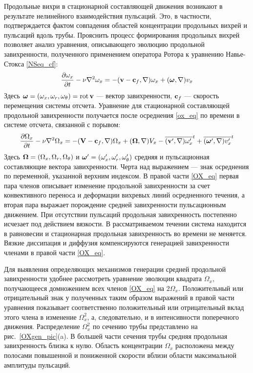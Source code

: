Продольные вихри в стационарной составляющей движения возникают в результате нелинейного взаимодействия пульсаций. Это, в частности, подтверждается фактом совпадения областей концентрации продольных вихрей и пульсаций вдоль трубы. Прояснить процесс формирования продольных вихрей позволяет анализ уравнения, описывающего эволюцию продольной завихренности, полученного применением оператора Ротора к уравнению Навье-Стокса \eqref{NSeq_cf}:
\begin{equation}\label{ox_eq}
\frac{\partial \omega_x}{\partial t} - \nu\nabla^2 \omega_x =  -  (\mathbf{v} - \mathbf{c}_f, \nabla) \omega_x + (\mbox{\boldmath$\omega$}, \nabla) v_x
\end{equation}
Здесь $\mbox{\boldmath$\omega$} = (\omega_x, \omega_r, \omega_\theta) = \operatorname{rot} \mathbf{v}$ --- вектор завихренности, $\mathbf{c}_f$ --- скорость перемещения системы отсчета. Уравнение для стационарной составляющей продольной завихренности получается после осреднения \eqref{ox_eq} по времени в системе отсчета, связанной с порывом:
\begin{equation}\label{OX_eq}
\frac{\partial \Omega_x}{\partial t} - \nu\nabla^2 \Omega_x = - (\mathbf{V} - \mathbf{c}_f, \nabla) \Omega_x + (\mbox{\boldmath$\Omega$}, \nabla) V_x - \overline{(\mathbf{v}', \nabla) \omega'_x}^t + \overline{ (\mbox{\boldmath$\omega$}', \nabla) v'_x }^t
\end{equation}
Здесь  $\mbox{\boldmath$\Omega$}=(\Omega_x, \Omega_r, \Omega_\theta)$ и $\mbox{\boldmath$\omega$}'=(\omega'_x, \omega'_r, \omega'_\theta)$ средняя и пульсационная составляющие вектора завихренности. Черта над выражением --- знак осреднения по переменной, указанной верхним индексом. В правой части \eqref{OX_eq} первая пара членов описывает изменение продольной завихренности за счет конвективного переноса и деформации вихревых линий осредненного течения, а вторая пара выражает порождение средней завихренности пульсационным движением. При отсутствии пульсаций продольная завихренность постепенно исчезает под действием вязкости. В рассматриваемом течении система находится в равновесии и стационарная продольная завихренность во времени не меняется. Вязкие диссипация и диффузия компенсируются генерацией завихренности членами в правой части \eqref{OX_eq}.

Для выявления определяющих механизмов генерации средней продольной завихренности удобнее рассмотреть уравнение эволюции квадрата $\Omega_x$, получающееся домножением всех членов \eqref{OX_eq} на $2\Omega_x$. Положительный или отрицательный знак у полученных таким образом выражений в правой части уравнения показывает соответственно положительный или отрицательный вклад этого члена в изменение $\Omega_x^2$, а, следовательно, и в интенсивности поперечного движения. Распределение $\Omega_x^2$ по сечению трубы представлено на рис.~\ref{OXgen_pic}(a). В большей части сечения трубы средняя продольная завихренность близка к нулю. Область концентрации $\Omega_x$ расположена между полосами повышенной и пониженной скорости вблизи области максимальной амплитуды пульсаций.

